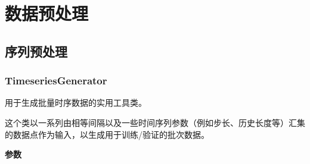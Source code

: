 \section{数据预处理}
\subsection{序列预处理}
\subsubsection{TimeseriesGenerator}\label{preprocessing-sequence}

\begin{Shaded}
\begin{Highlighting}[]
\OperatorTok{=}
\OperatorTok{=}
\OperatorTok{=}
\OperatorTok{=}
\OperatorTok{=}
\OperatorTok{=}
\OperatorTok{=}\NormalTok{)}
\end{Highlighting}
\end{Shaded}

用于生成批量时序数据的实用工具类。

这个类以一系列由相等间隔以及一些时间序列参数（例如步长、历史长度等）汇集的数据点作为输入，以生成用于训练/验证的批次数据。

\textbf{参数}

